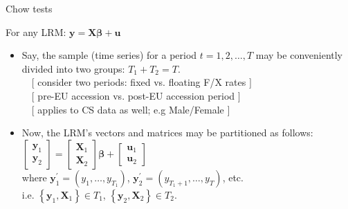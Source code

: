 \documentclass{beamer}
\begin{document}


\begin{frame}{Chow tests}

For any LRM: $\bm{y} = \bm{X\beta}+\bm{u}$
\vspace{0.3cm}

\begin{itemize}

\item Say, the sample (time series) for a period $t=1,2, \dots, T$ may be conveniently divided into two groups: $T_1 + T_2 = T$.  \\ 
~~$[$ consider two periods: fixed vs. floating F/X rates $]$ \\ 
~~$[$ pre-EU accession vs. post-EU accession period $]$ \\
~~$[$ applies to CS data as well; e.g Male/Female $]$
\vspace{0.3cm}
\item Now, the LRM's vectors and matrices may be partitioned as follows: \\
\vspace{0.3cm}
$ \begin{bmatrix} \bm{y}_1 \\ \bm{y}_2 \end{bmatrix} = 
\begin{bmatrix} \bm{X}_1 \\ \bm{X}_2 \end{bmatrix} \bm{\beta} +
\begin{bmatrix} \bm{u}_1 \\ \bm{u}_2 \end{bmatrix}$ \\
\vspace{0.2cm}
where $\bm{y}_1^\prime = (y_1, \dots , y_{T_1})$, 
$\bm{y}_2^\prime = (y_{T_1+1}, \dots , y_{T})$, etc. 
\\ i.e. $\left\lbrace\bm{y}_1, \bm{X}_1 \right\rbrace \in T_1$,  
$\left\lbrace\bm{y}_2, \bm{X}_2 \right\rbrace \in T_2$. 

\end{itemize}

\end{frame}



\end{document}
